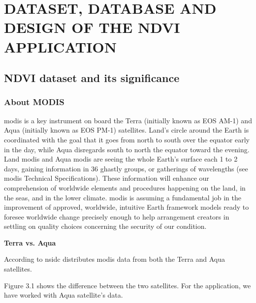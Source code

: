 \chapter{DATASET, DATABASE AND DESIGN OF THE NDVI APPLICATION}
\label{chap:dataset & database}

\section{NDVI dataset and its significance}

\subsection{About MODIS}

\newcommand{\MYhref}[3][blue]{\href{#2}{\color{#1}{#3}}}%

\centerline{\MYhref{https://modis.gsfc.nasa.gov/}{NASA's MODIS website}}

\gls{modis} is a key instrument on board the Terra (initially known as EOS AM-1) and Aqua (initially known as EOS PM-1) satellites. Land's circle around the Earth is coordinated with the goal that it goes from north to south over the equator early in the day, while Aqua disregards south to north the equator toward the evening. Land \gls{modis} and Aqua \gls{modis} are seeing the whole Earth's surface each 1 to 2 days, gaining information in 36 ghastly groups, or gatherings of wavelengths (see \gls{modis} Technical Specifications). These information will enhance our comprehension of worldwide elements and procedures happening on the land, in the seas, and in the lower climate. \gls{modis} is assuming a fundamental job in the improvement of approved, worldwide, intuitive Earth framework models ready to foresee worldwide change precisely enough to help arrangement creators in settling on quality choices concerning the security of our condition. \\

\centerline{\textbf{Terra vs. Aqua}}

According to \gls{nsidc} distributes \gls{modis} data from both the Terra and Aqua satellites.

Figure 3.1 shows the difference between the two satellites. For the application, we have worked with Aqua satellite's data.

